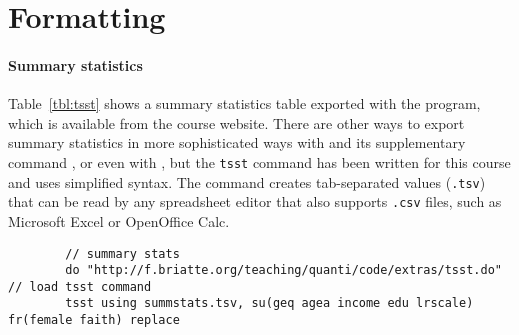 % 

\section{Formatting}

\paragraph{Summary statistics} Table~\ref{tbl:tsst} shows a summary statistics table exported with the  program, which is available from the course website. There are other ways to export summary statistics in more sophisticated ways with  and its supplementary command , or even with , but the \texttt{tsst} command has been written for this course and uses simplified syntax. The command creates tab-separated values (\texttt{.tsv}) that can be read by any spreadsheet editor that also supports \texttt{.csv} files, such as Microsoft Excel or OpenOffice Calc.

{
	\renewcommand\arraystretch{1.5}
	\def\sym#1{\ifmmode^{#1}\else\(^{#1}\)\fi}

	\begin{table}[htp]

 	\caption[Summary statistics produced with .]{\label{tbl:tsst}
	Summary statistics produced with .}
	\end{table}%
	\renewcommand\arraystretch{1}
	\begin{verbatim}
		// summary stats
		do "http://f.briatte.org/teaching/quanti/code/extras/tsst.do" // load tsst command
		tsst using summstats.tsv, su(geq agea income edu lrscale) fr(female faith) replace
	\end{verbatim}
}


